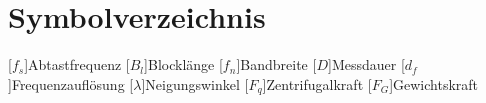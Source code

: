 \chapter*{Symbolverzeichnis}
\begin{acronym}[BreiteDerLinkenSpalte]
[$f_s$]{Abtastfrequenz}
[$B_l$]{Blocklänge}
[$f_n$]{Bandbreite}
[$D$]{Messdauer}
[$d_f$]{Frequenzauflösung}
[$\lambda$]{Neigungswinkel}
[$F_q$]{Zentrifugalkraft}
[$F_G$]{Gewichtskraft}
\end{acronym}